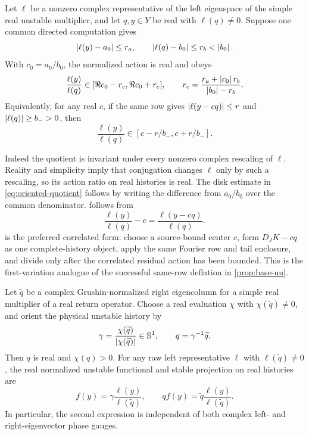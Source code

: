 \begin{lemma}
\label{lem:phase-invariant-quotient}
Let \(\ell\) be a nonzero complex representative of the left eigenspace of
the simple real unstable multiplier, and let \(q,y\in Y\) be real with
\(\ell(q)\ne0\).  Suppose one common directed computation gives
\[
 \left\lvert\ell(y)-a_0\right\rvert\le r_a,
 \qquad \left\lvert\ell(q)-b_0\right\rvert\le r_b<\left\lvert b_0\right\rvert.
\]
With \(c_0=a_0/b_0\), the normalized action is real and obeys
\begin{equation}
 \frac{\ell(y)}{\ell(q)}
 \in[\Re c_0-r_c,\Re c_0+r_c],
 \qquad
 r_c=\frac{r_a+\left\lvert c_0\right\rvert r_b}{\left\lvert b_0\right\rvert-r_b}.          \label{eq:oriented-quotient}
\end{equation}
Equivalently, for any real \(c\), if the same row gives
\(\left\lvert\ell(y-cq)\right\rvert\le r\) and \(\left\lvert\ell(q)\right\rvert\ge b_->0\), then
\begin{equation}
 \frac{\ell(y)}{\ell(q)}
 \in[c-r/b_-,c+r/b_-].                                \label{eq:same-row-residual-quotient}
\end{equation}
\end{lemma}

Indeed the quotient is invariant under every nonzero complex rescaling of
\(\ell\).  Reality and simplicity imply that conjugation changes \(\ell\)
only by such a rescaling, so its action ratio on real histories is real.
The disk estimate in \cref{eq:oriented-quotient} follows by writing the
difference from \(a_0/b_0\) over the common denominator.
 follows from
\[
 \frac{\ell(y)}{\ell(q)}-c
 =\frac{\ell(y-cq)}{\ell(q)}.
\]
 is the preferred correlated form: choose
a source-bound center \(c\), form \(D_JK-cq\) as one complete-history object,
apply the same Fourier row and tail enclosure, and divide only after the
correlated residual action has been bounded.  This is the first-variation
analogue of the successful same-row deflation in
\cref{prop:base-uu}.

\begin{lemma}
\label{lem:right-gauge}
Let \(\widetilde q\) be a complex Grushin-normalized right eigencolumn for a
simple real multiplier of a real return operator.  Choose a real evaluation
\(\chi\) with \(\chi(\widetilde q)\ne0\), and orient the physical unstable
history by
\[
 \gamma=\frac{\chi(\widetilde q)}
               {\left\lvert\chi(\widetilde q)\right\rvert}\in\mathbb S^1,
 \qquad
 q=\gamma^{-1}\widetilde q .
\]
Then \(q\) is real and \(\chi(q)>0\).  For any raw left representative
\(\ell\) with \(\ell(\widetilde q)\ne0\), the real normalized unstable
functional and stable projection on real histories are
\begin{equation}
 f(y)=\gamma\frac{\ell(y)}{\ell(\widetilde q)},
 \qquad
 qf(y)=\widetilde q\frac{\ell(y)}{\ell(\widetilde q)}. \label{eq:right-gauge}
\end{equation}
In particular, the second expression is independent of both complex
left- and right-eigenvector phase gauges.
\end{lemma}

